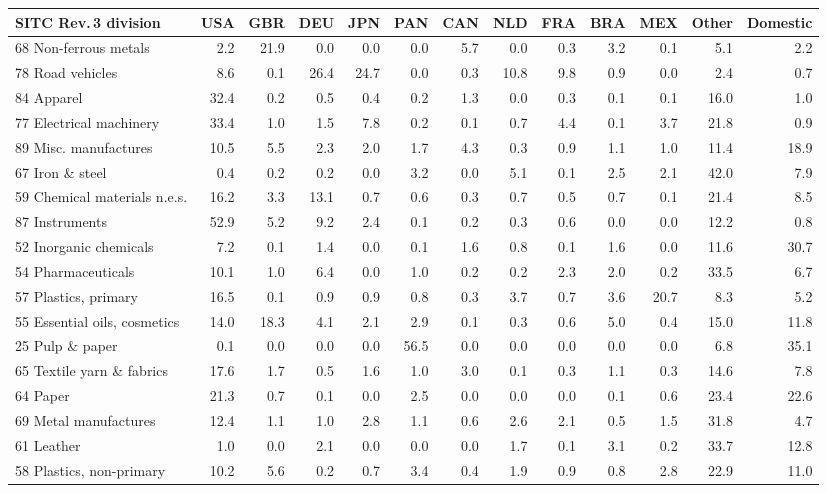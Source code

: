 \begin{tabular}{lrrrrrrrrrrrr}
\toprule
SITC Rev.\,3 division & USA & GBR & DEU & JPN & PAN & CAN & NLD & FRA & BRA & MEX & Other & Domestic \\
\midrule
68 Non-ferrous metals & 2.2 & 21.9 & 0.0 & 0.0 & 0.0 & 5.7 & 0.0 & 0.3 & 3.2 & 0.1 & 5.1 & 2.2 \\
78 Road vehicles & 8.6 & 0.1 & 26.4 & 24.7 & 0.0 & 0.3 & 10.8 & 9.8 & 0.9 & 0.0 & 2.4 & 0.7 \\
84 Apparel & 32.4 & 0.2 & 0.5 & 0.4 & 0.2 & 1.3 & 0.0 & 0.3 & 0.1 & 0.1 & 16.0 & 1.0 \\
77 Electrical machinery & 33.4 & 1.0 & 1.5 & 7.8 & 0.2 & 0.1 & 0.7 & 4.4 & 0.1 & 3.7 & 21.8 & 0.9 \\
89 Misc. manufactures & 10.5 & 5.5 & 2.3 & 2.0 & 1.7 & 4.3 & 0.3 & 0.9 & 1.1 & 1.0 & 11.4 & 18.9 \\
67 Iron \& steel & 0.4 & 0.2 & 0.2 & 0.0 & 3.2 & 0.0 & 5.1 & 0.1 & 2.5 & 2.1 & 42.0 & 7.9 \\
59 Chemical materials n.e.s. & 16.2 & 3.3 & 13.1 & 0.7 & 0.6 & 0.3 & 0.7 & 0.5 & 0.7 & 0.1 & 21.4 & 8.5 \\
87 Instruments & 52.9 & 5.2 & 9.2 & 2.4 & 0.1 & 0.2 & 0.3 & 0.6 & 0.0 & 0.0 & 12.2 & 0.8 \\
52 Inorganic chemicals & 7.2 & 0.1 & 1.4 & 0.0 & 0.1 & 1.6 & 0.8 & 0.1 & 1.6 & 0.0 & 11.6 & 30.7 \\
54 Pharmaceuticals & 10.1 & 1.0 & 6.4 & 0.0 & 1.0 & 0.2 & 0.2 & 2.3 & 2.0 & 0.2 & 33.5 & 6.7 \\
57 Plastics, primary & 16.5 & 0.1 & 0.9 & 0.9 & 0.8 & 0.3 & 3.7 & 0.7 & 3.6 & 20.7 & 8.3 & 5.2 \\
55 Essential oils, cosmetics & 14.0 & 18.3 & 4.1 & 2.1 & 2.9 & 0.1 & 0.3 & 0.6 & 5.0 & 0.4 & 15.0 & 11.8 \\
25 Pulp \& paper & 0.1 & 0.0 & 0.0 & 0.0 & 56.5 & 0.0 & 0.0 & 0.0 & 0.0 & 0.0 & 6.8 & 35.1 \\
65 Textile yarn \& fabrics & 17.6 & 1.7 & 0.5 & 1.6 & 1.0 & 3.0 & 0.1 & 0.3 & 1.1 & 0.3 & 14.6 & 7.8 \\
64 Paper & 21.3 & 0.7 & 0.1 & 0.0 & 2.5 & 0.0 & 0.0 & 0.0 & 0.1 & 0.6 & 23.4 & 22.6 \\
69 Metal manufactures & 12.4 & 1.1 & 1.0 & 2.8 & 1.1 & 0.6 & 2.6 & 2.1 & 0.5 & 1.5 & 31.8 & 4.7 \\
61 Leather & 1.0 & 0.0 & 2.1 & 0.0 & 0.0 & 0.0 & 1.7 & 0.1 & 3.1 & 0.2 & 33.7 & 12.8 \\
58 Plastics, non-primary & 10.2 & 5.6 & 0.2 & 0.7 & 3.4 & 0.4 & 1.9 & 0.9 & 0.8 & 2.8 & 22.9 & 11.0 \\

\end{tabular}
